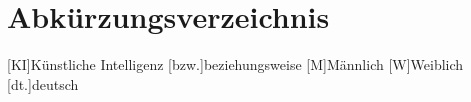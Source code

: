 
\chapter*{Abkürzungsverzeichnis}
%	
\begin{doublespace}
    
\begin{acronym}[YTMMM]
\setlength{\itemsep}{-\parsep}

[KI]{Künstliche Intelligenz}
[bzw.]{beziehungsweise}
[M]{Männlich}
[W]{Weiblich}
[dt.]{deutsch}
\end{acronym}
    
\end{doublespace}